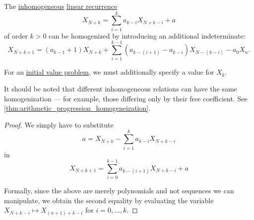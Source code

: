 \begin{proposition}\label{thm:linear_recurrence_relation_homogenization}
  The \hyperref[def:homogeneous_linear_recurrence]{inhomogeneous} \hyperref[def:linear_recurrence]{linear recurrence}
  \begin{equation*}
    X_{N+k}
    =
    \sum_{i=1}^k a_{k-i} X_{N+k-i} + a
  \end{equation*}
  of order \( k > 0 \) can be homogenized by introducing an additional indeterminate:
  \begin{equation}\label{eq:thm:linear_recurrence_relation_homogenization}
    X_{N+k+1}
    =
    (a_{k-1} + 1) X_{N+k} + \sum_{i=1}^{k-1} (a_{k-(i+1)} - a_{k-i}) X_{N-(k-i)} - a_0 X_n.
  \end{equation}

\end{proposition}
\begin{comments}
  \item For an \hyperref[def:recurrence_relation/initial]{initial value problem}, we must additionally specify a value for \( X_k \).

  \item It should be noted that different inhomogeneous relations can have the same homogenization --- for example, those differing only by their free coefficient. See \cref{thm:arithmetic_progression_homogeneization}.
\end{comments}
\begin{proof}
  We simply have to substitute
  \begin{equation*}
    a = X_{N+k} - \sum_{i=1}^k a_{k-i} X_{N+k-i}
  \end{equation*}
  in
  \begin{equation*}
    X_{N+k+1} = \sum_{i=0}^{k-1} a_{k-(i+1)} X_{N+k-i} + a
  \end{equation*}

  Formally, since the above are merely polynomials and not sequences we can manipulate, we obtain the second equality by evaluating the variable \( X_{N+k-i} \mapsto X_{(n+1)+k-i} \) for \( i = 0, \ldots, k \).
\end{proof}

